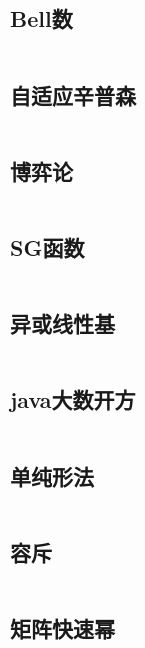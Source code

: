 \inputminted{cpp}{code/FirstStirling.cc}

\subsection{Bell数} 

\inputminted{cpp}{code/Bell数.cc}

\subsection{自适应辛普森} 

\inputminted{cpp}{code/AdaptiveSimpson.cc}

\subsection{博弈论} 

\inputminted{text}{code/game.txt}

\subsection{SG函数} 

\inputminted{cpp}{code/SG函数.cc}

\subsection{异或线性基} 

\inputminted{cpp}{code/LinearBasis.cc}

\subsection{java大数开方} 

\inputminted{java}{code/BigIntegerSqrt.java}

\subsection{单纯形法} 

\inputminted{cpp}{code/simplex.cc}

\subsection{容斥} 

\inputminted{cpp}{code/rongchi.cc}

\subsection{矩阵快速幂} 

